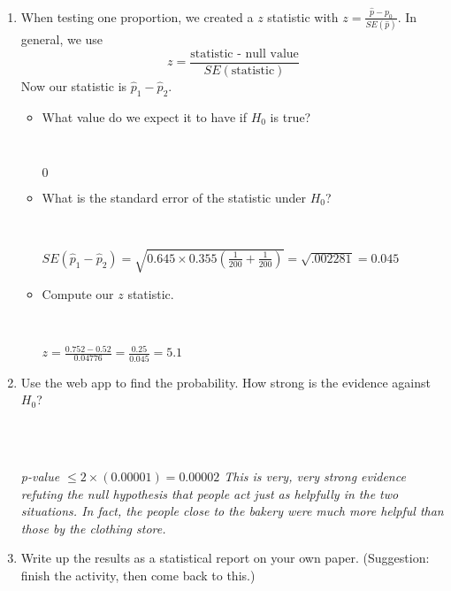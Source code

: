 \begin{enumerate}
\item When testing one proportion, we created a $z$ statistic with
$z = \frac{\widehat{p} - p_0}{SE(\widehat{p})}$.  In general, we use
$$ z = \frac{\mbox{statistic - null value}}{SE(\mbox{statistic})}$$
Now our statistic is $\widehat{p}_1 - \widehat{p}_2$.  
\begin{itemize}
\item What value do we expect it to have if $H_0$ is true?
\begin{students}
 \vspace{1cm}\\
\end{students}
\begin{key}
  $0$ \\
\end{key}
\item What is the standard error of the statistic under $H_0$?
\begin{students}
 \vspace{1cm}\\
\end{students}

\begin{key}
  $SE(\widehat{p}_1 - \widehat{p}_2 ) = \sqrt{ 0.645\times 0.355
    (\frac{1}{200} +  \frac{1}{200})} = \sqrt{.002281} = 0.045$ 
\end{key}

\item Compute our $z$ statistic.
\begin{students}
 \vspace{1cm}\\
\end{students}
\begin{key}
 $z = \frac{ 0.752 - 0.52}{0.04776} = \frac{0.25}{0.045} = 5.1$ \\
\end{key}  
\end{itemize}
\item Use the web app to find the probability.  
How strong is the evidence against $H_0$?
\begin{students}
 \vspace{1cm}\\
\end{students}
\begin{key}
  \\ {\it p-value $ \leq 2 \times(0.00001) = 0.00002$ This is very, very
    strong evidence refuting the null hypothesis that people act just
    as helpfully in the two situations.  In fact, the people close to
    the bakery were much more helpful than those by the clothing
    store.  }
\end{key}

\item Write up the results as a statistical report on your own paper.
  (Suggestion:  finish the activity, then come back to this.) 
\begin{students}
 \vspace{1cm}
\end{students}

  \end{enumerate}

